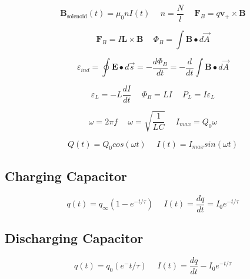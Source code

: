 \documentclass[twocolumn, 12pt]{article}
\begin{document}
\begin{equation*}
    \textbf{B}_{\text{solenoid}}(t) = \mu_0 nI(t) \hspace{15pt} n=\frac{N}{l} \hspace{15pt} \textbf{F}_B = q\textbf{v}_+ \times \textbf{B}
\end{equation*}

\begin{equation*}
    \textbf{F}_B =I\textbf{L}\times \textbf{B} \hspace{15pt} \Phi_B = \int \textbf{B} \bullet d\vec{A} 
\end{equation*}

\begin{equation*}
   \boxed{ \varepsilon_{ind} = \oint\textbf{E} \bullet d\vec{s} = -\frac{d\Phi_B}{dt} =-\frac{d}{dt} \int \textbf{B} \bullet d\vec{A}}
\end{equation*}

\begin{equation*}
    \varepsilon_L = -L\frac{dI}{dt} \hspace{15pt} \Phi_B =LI \hspace{15pt} P_L = I\varepsilon_L 
\end{equation*}

\begin{equation*}
    \omega =2\pi f \hspace{15pt} \omega = \sqrt{\frac{1}{LC}} \hspace{15pt} I_{max}= Q_0 \omega
\end{equation*}

\begin{equation*}
    Q(t) = Q_0cos(\omega t) \hspace{15pt} I(t) = I_{max}sin(\omega t)
\end{equation*}






\subsection*{Charging Capacitor}
\begin{equation*}
    q(t) = q_\infty (1-e^{-t/\tau}) \hspace{15pt}  I(t) = \frac{dq}{dt} = I_0e^{-t/\tau}
\end{equation*}




\subsection*{Discharging Capacitor}
\begin{equation*}
    q(t) = q_0 (e^-t/\tau ) \hspace{15pt}  I(t) = \frac{dq}{dt} -I_0 e^{-t/\tau }
\end{equation*}
\end{document}
